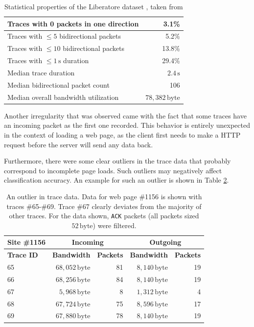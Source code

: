 \documentclass[
	ruledheaders=chapter,
	class=report,
	thesis={type=master, department=inf},
	accentcolor=1c,
	custommargins=true,
	marginpar=false,
	parskip=half-,
	fontsize=11pt,
]{tudapub}
\begin{document}
	\begin{table}
		\centering
		\begin{tabularx}{0.7\textwidth}{|X|r|}
			\hline Traces with 0 packets in one direction & 3.1\% \\
			\hline Traces with $\leq 5$ bidirectional packets & 5.2\% \\
			\hline Traces with $\leq 10$ bidirectional packets & 13.8\% \\
			\hline Traces with $\leq 1\,\text{s}$ duration & 29.4\% \\
			\hline Median trace duration & $2.4\,\text{s}$ \\
			\hline Median bidirectional packet count & 106 \\
			\hline Median overall bandwidth utilization & $78,382\,\text{byte}$ \\
			\hline
		\end{tabularx}
		\caption{Statistical properties of the Liberatore dataset \cite{Liberatore2006}, taken from \cite{Dyer2012}}
		\label{tbl:dataset_props}
	\end{table} 
	
	Another irregularity that was observed came with the fact that some traces have an incoming packet as the first one recorded. This behavior is entirely unexpected in the context of loading a web page, as the client first needs to make a HTTP request before the server will send any data back.
	
	Furthermore, there were some clear outliers in the trace data that probably correspond to incomplete page loads. Such outliers may negatively affect classification accuracy. An example for such an outlier is shown in Table \ref{tbl:outlier}.
	
	\begin{table}
		\centering
		\begin{tabular}{|l||r|r||r|r|}
			\hline \textbf{Site \#1156} & \multicolumn{2}{c||}{\textbf{Incoming}} & \multicolumn{2}{c|}{\textbf{Outgoing}} \\
			 \hline\textbf{Trace ID} & \textbf{Bandwidth} & \textbf{Packets} & \textbf{Bandwidth} & \textbf{Packets} \\
			\hline 65 & $68,052\,\text{byte}$ & 81 & $8,140\,\text{byte}$ & 19 \\
			\hline 66 & $68,256\,\text{byte}$ & 84 & $8,140\,\text{byte}$ & 19 \\
			\hline 67 & $5,968\,\text{byte}$ & 8 & $1,312\,\text{byte}$ & 4 \\
			\hline 68 & $67,724\,\text{byte}$ & 75 & $8,596\,\text{byte}$ & 17 \\
			\hline 69 & $67,880\,\text{byte}$ & 78 & $8,140\,\text{byte}$ & 19 \\
			\hline
		\end{tabular}
		\caption[An outlier in trace data]{An outlier in trace data. Data for web page \#1156 is shown with traces \#65-\#69. Trace \#67 clearly deviates from the majority of other traces. For the data shown, \texttt{ACK} packets (all packets sized $52\,\text{byte}$) were filtered.}
		\label{tbl:outlier}
	\end{table}
\end{document}
